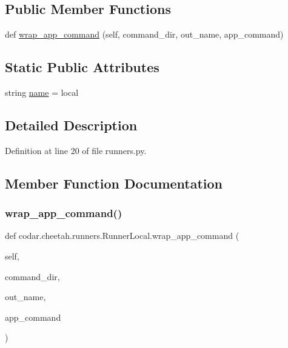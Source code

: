 \subsection*{Public Member Functions}
\begin{DoxyCompactItemize}
\item 
def \hyperlink{classcodar_1_1cheetah_1_1runners_1_1_runner_local_a188cd7fa3f8ebd97c936f2f00ee5b496}{wrap\+\_\+app\+\_\+command} (self, command\+\_\+dir, out\+\_\+name, app\+\_\+command)
\end{DoxyCompactItemize}
\subsection*{Static Public Attributes}
\begin{DoxyCompactItemize}
\item 
string \hyperlink{classcodar_1_1cheetah_1_1runners_1_1_runner_local_a0456010ad8c87331e23127a490227bf1}{name} = \textquotesingle{}local\textquotesingle{}
\end{DoxyCompactItemize}


\subsection{Detailed Description}


Definition at line 20 of file runners.\+py.



\subsection{Member Function Documentation}
\mbox{\label{classcodar_1_1cheetah_1_1runners_1_1_runner_local_a188cd7fa3f8ebd97c936f2f00ee5b496}} 
\subsubsection{\texorpdfstring{wrap\+\_\+app\+\_\+command()}{wrap\_app\_command()}}
{\footnotesize\ttfamily def codar.\+cheetah.\+runners.\+Runner\+Local.\+wrap\+\_\+app\+\_\+command (\begin{DoxyParamCaption}\item[{}]{self,  }\item[{}]{command\+\_\+dir,  }\item[{}]{out\+\_\+name,  }\item[{}]{app\+\_\+command }\end{DoxyParamCaption})}

